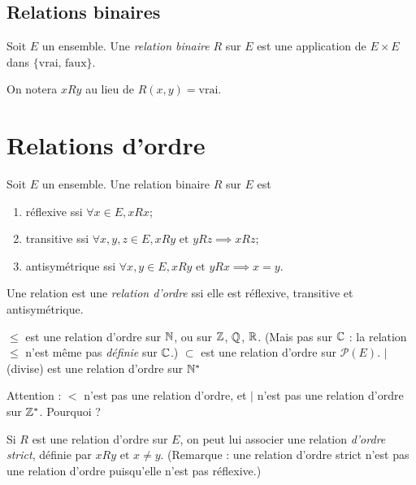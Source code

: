 \subsection{Relations binaires}

\begin{definition} Soit $E$ un ensemble. Une \emph{relation binaire} $R$ sur $E$ est une application de $E\times E$ dans $\{\text{vrai, faux}\}$.
\end{definition}

On notera $xRy$ au lieu de $R(x,y)=\text{vrai}$.

\section{Relations d'ordre}

\begin{definition}
Soit $E$ un ensemble. Une relation binaire $R$ sur $E$ est
\begin{enumerate}
\item réflexive ssi $\forall x\in E, xRx$;
\item transitive ssi $\forall x, y, z\in E, xRy \text{ et } yRz \implies xRz$;
\item antisymétrique ssi $\forall x, y \in E, xRy\text{ et } yRx \implies x=y$.
\end{enumerate}

Une relation est une \emph{relation d'ordre} ssi elle est réflexive, transitive et antisymétrique.
\end{definition}

\begin{exemples}
$\leq$ est une relation d'ordre sur $\mathbb{N}$, ou sur $\mathbb{Z}$, $\mathbb{Q}$, $\mathbb{R}$. (Mais pas sur $\mathbb{C}$ : la relation $\leq$ n'est même pas \emph{définie} sur $\mathbb{C}$.)
$\subset$ est une relation d'ordre sur $\mathcal P(E)$.
$|$ (\og divise\fg) est une relation d'ordre sur $\mathbb{N}^*$
\end{exemples}

Attention : $<$ n'est pas une relation d'ordre, et $|$ n'est pas une relation d'ordre sur $\mathbb{Z}^*$. Pourquoi ?

\begin{definition}
Si $R$ est une relation d'ordre sur $E$, on peut lui associer une relation \emph{d'ordre strict}, définie par \og$ xRy\text{ et }x\neq y$\fg. (Remarque : une relation d'ordre strict n'est pas une relation d'ordre puisqu'elle n'est pas réflexive.)
\end{definition}

